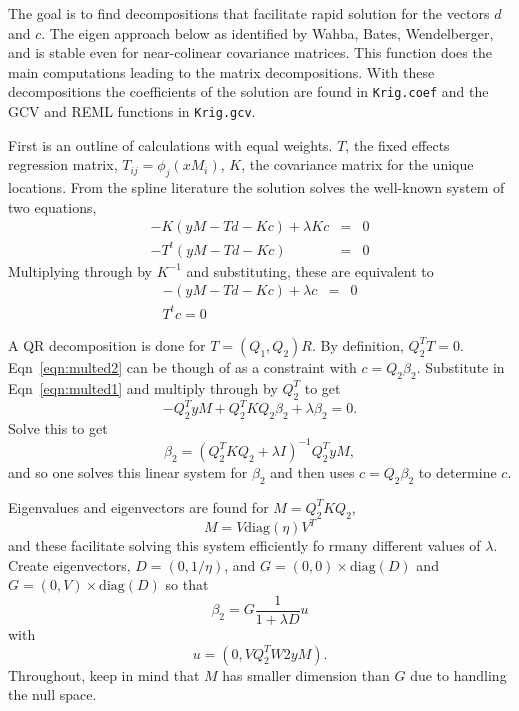 \documentclass{article}
\begin{document}
The goal is to find decompositions that facilitate rapid solution for the vectors
$d$ and $c$. The eigen approach below as identified by Wahba, Bates, Wendelberger, and is stable
even for near-colinear covariance matrices. This function does the main computations leading to the 
matrix decompositions. With these decompositions the coefficients of the solution
are found in \texttt{Krig.coef} and the GCV and REML functions in \texttt{Krig.gcv}.

First is an outline of calculations with equal weights. $T$, the fixed effects regression matrix,
$T_{ij} = \phi_j(xM_i)$, $K$, the covariance matrix for the unique locations. From the spline literature
the solution solves the well-known system of two equations,
\begin{eqnarray}
  -K(yM - Td - Kc) + \lambda Kc & = & 0 \\
  -T^t ( yM - Td - Kc) & = & 0
\end{eqnarray}
Multiplying through by $K^{-1}$ and substituting, these are equivalent to
\begin{eqnarray}
  -(yM - Td - Kc) + \lambda c & = & 0 \label{eqn:multed1}\\
  T^t c = 0 \label{eqn:multed2}
\end{eqnarray}

A QR decomposition is done for $T=(Q_1, Q_2) R$. By definition, $Q_2^T T = 0$.
Eqn~\ref{eqn:multed2} can be though of as a constraint with $c=Q_2\beta_2$. Substitute
in Eqn~\ref{eqn:multed1} and multiply through by $Q_2^T$ to get
\begin{equation}
  -Q_2^T yM + Q_2^T K Q_2 \beta_2 + \lambda \beta_2 = 0.
\end{equation}
Solve this to get
\begin{equation}
  \beta_2 = (Q_2^T K Q_2 + \lambda I)^{-1} Q_2^T yM,
\end{equation}
and so one solves this linear system for $\beta_2$ and then
uses $ c=Q_2 \beta_2$ to determine $c$. 

Eigenvalues and eigenvectors are found for $M=Q_2^T K Q_2$,
\begin{equation}
  M = V \mbox{diag}(\eta) V^T
\end{equation}
and these facilitate solving this system efficiently fo rmany different
values of $\lambda$. Create eigenvectors, $D=(0, 1/\eta)$, and
$G=(0,0) \times \mbox{diag}(D)$  and $G=(0,V) \times \mbox{diag}(D)$ so that
\begin{equation}
  \beta_2 = G \frac{1}{1+\lambda D} u
\end{equation}
with
\begin{equation}
  u = (0, V Q_2^T W2 yM).
\end{equation}
Throughout, keep in mind that $M$ has smaller dimension than $G$ due to
handling the null space.
\end{document}

